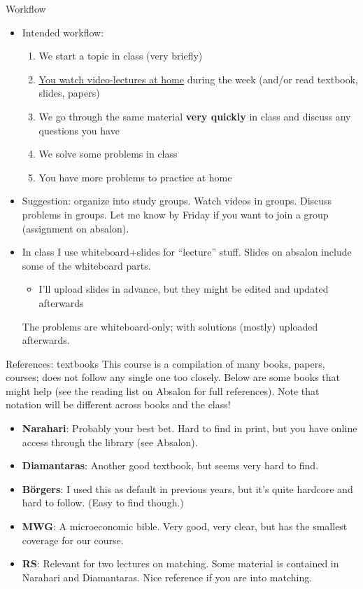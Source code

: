 \documentclass[english,10pt
,aspectratio=169
]{beamer}
\begin{document}
\begin{frame}{Workflow}
	\begin{itemize}
		\item Intended workflow: 
		\begin{enumerate}
			\item We start a topic in class (very briefly)
			\item \href{https://www.youtube.com/playlist?list=PL4pUs4P_j1WasI0kO99OgNNd_hJwpct4D}{\uline{You watch video-lectures at home}} during the week (and/or read textbook, slides, papers)
			\item We go through the same material \textbf{very quickly} in class and discuss any questions you have
			\item We solve some problems in class
			\item You have more problems to practice at home
		\end{enumerate}
		\pause
		\item Suggestion: organize into study groups. Watch videos in groups. Discuss problems in groups. Let me know by Friday if you want to join a group (assignment on absalon).
		\pause
		\item In class I use whiteboard+slides for ``lecture'' stuff. Slides on absalon include some of the whiteboard parts.
		\begin{itemize}
			\item I'll upload slides in advance, but they might be edited and updated afterwards
		\end{itemize}
		The problems are whiteboard-only; with solutions (mostly) uploaded afterwards.
	\end{itemize}
\end{frame}


\begin{frame}{References: textbooks}
	This course is a compilation of many books, papers, courses; does not follow any single one too closely. Below are some books that might help (see the reading list on Absalon for full references). Note that notation will be different across books and the class!
	\begin{itemize}%
		\item \alert{\textbf{Narahari}}: Probably your best bet. Hard to find in print, but you have online access through the library (see Absalon).
		\item \textbf{Diamantaras}: Another good textbook, but seems very hard to find.
		\item \textbf{B\"{o}rgers}: I used this as default in previous years, but it's quite hardcore and hard to follow. (Easy to find though.)
		\item \textbf{MWG}: A microeconomic bible. Very good, very clear, but has the smallest coverage for our course.
		\item \textbf{RS}: Relevant for two lectures on matching. Some material is contained in Narahari and Diamantaras. Nice reference if you are into matching.
	\end{itemize}

\end{frame}
\end{document}
